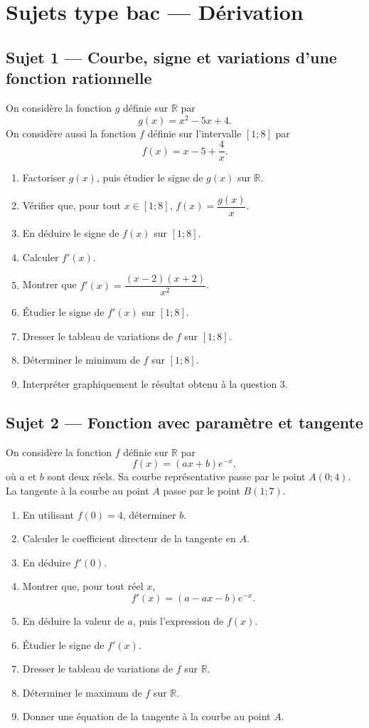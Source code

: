 
\section*{Sujets type bac — Dérivation}

\subsection*{Sujet 1 — Courbe, signe et variations d'une fonction rationnelle}
On considère la fonction $g$ définie sur $\mathbb{R}$ par
\[
  g(x)=x^2-5x+4.
\]
On considère aussi la fonction $f$ définie sur l'intervalle $[1;8]$ par
\[
  f(x)=x-5+\frac4x.
\]
\begin{enumerate}
  \item Factoriser $g(x)$, puis étudier le signe de $g(x)$ sur $\mathbb{R}$.
  \item Vérifier que, pour tout $x\in[1;8]$, $f(x)=\dfrac{g(x)}{x}$.
  \item En déduire le signe de $f(x)$ sur $[1;8]$.
  \item Calculer $f'(x)$.
  \item Montrer que $f'(x)=\dfrac{(x-2)(x+2)}{x^2}$.
  \item Étudier le signe de $f'(x)$ sur $[1;8]$.
  \item Dresser le tableau de variations de $f$ sur $[1;8]$.
  \item Déterminer le minimum de $f$ sur $[1;8]$.
  \item Interpréter graphiquement le résultat obtenu à la question 3.
\end{enumerate}

\subsection*{Sujet 2 — Fonction avec paramètre et tangente}
On considère la fonction $f$ définie sur $\mathbb{R}$ par
\[
  f(x)=(ax+b)e^{-x},
\]
où $a$ et $b$ sont deux réels. Sa courbe représentative passe par le point $A(0;4)$. La tangente à la courbe au point $A$ passe par le point $B(1;7)$.
\begin{enumerate}
  \item En utilisant $f(0)=4$, déterminer $b$.
  \item Calculer le coefficient directeur de la tangente en $A$.
  \item En déduire $f'(0)$.
  \item Montrer que, pour tout réel $x$,
  \[
    f'(x)=(a-ax-b)e^{-x}.
  \]
  \item En déduire la valeur de $a$, puis l'expression de $f(x)$.
  \item Étudier le signe de $f'(x)$.
  \item Dresser le tableau de variations de $f$ sur $\mathbb{R}$.
  \item Déterminer le maximum de $f$ sur $\mathbb{R}$.
  \item Donner une équation de la tangente à la courbe au point $A$.
\end{enumerate}

